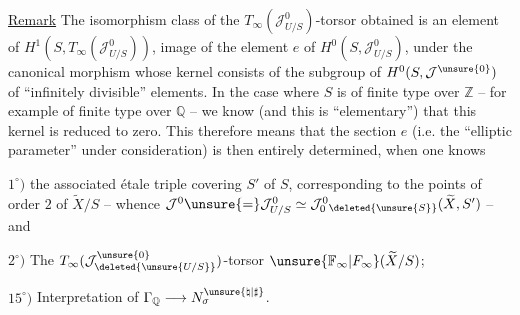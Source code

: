 
\uline{Remark} The isomorphism class of the $T_\infty(\mathcal J^0_{U/S})$-torsor obtained is an element of $H^1(S,T_\infty(\mathcal J^0_{U/S}))$, image of the element $e$ of $H^0(S,\mathcal J^0_{U/S})$, under the canonical morphism
whose kernel consists of the subgroup of $H^0(S,\mathcal J^{\unsure{0}})$ of ``infinitely divisible'' elements. In the case where $S$ is  of finite type over  $\mathbb Z$ -- for example  of finite type over $\mathbb Q$ -- we know (and this is  ``elementary'') that this kernel is reduced to zero. This therefore means that the section $e$  (i.e. the ``elliptic parameter'' under consideration) is then entirely determined, when one knows


$1^{\circ})$ the  associated étale triple covering $S'$ of $S$, corresponding to the points of order $2$ of $\widetilde X/S$ -- whence $\mathcal J^0\unsure{=}\mathcal J^0_{U/S}\simeq\mathcal J^0_0{}_{\deleted{\unsure{S}}}(\widetilde X,S')$ -- and

$2^{\circ})$ The $T_\infty(\mathcal J^{\unsure{0}}_{\deleted{\unsure{U/S}}})$-torsor $\unsure{\mathbb F_\infty|F_\infty}(\widetilde X/S)$;


$15^{\circ})$ Interpretation of $\Gamma_{\mathbb Q}\longrightarrow N_\sigma^{\unsure{\natural|\sharp}}$.

